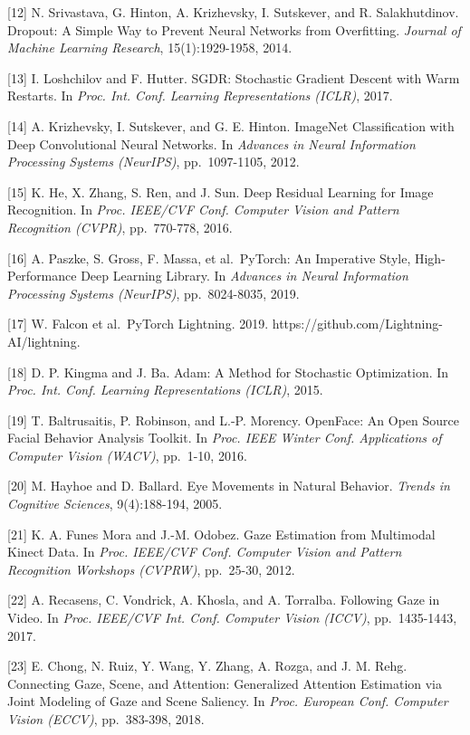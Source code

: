 \documentclass[
]{article}
\begin{document}
{[}12{]} N. Srivastava, G. Hinton, A. Krizhevsky, I. Sutskever, and R.
Salakhutdinov. Dropout: A Simple Way to Prevent Neural Networks from
Overfitting. \emph{Journal of Machine Learning Research},
15(1):1929-1958, 2014.

{[}13{]} I. Loshchilov and F. Hutter. SGDR: Stochastic Gradient Descent
with Warm Restarts. In \emph{Proc. Int. Conf. Learning Representations
(ICLR)}, 2017.

{[}14{]} A. Krizhevsky, I. Sutskever, and G. E. Hinton. ImageNet
Classification with Deep Convolutional Neural Networks. In
\emph{Advances in Neural Information Processing Systems (NeurIPS)},
pp.~1097-1105, 2012.

{[}15{]} K. He, X. Zhang, S. Ren, and J. Sun. Deep Residual Learning for
Image Recognition. In \emph{Proc. IEEE/CVF Conf. Computer Vision and
Pattern Recognition (CVPR)}, pp.~770-778, 2016.

{[}16{]} A. Paszke, S. Gross, F. Massa, et al.~PyTorch: An Imperative
Style, High-Performance Deep Learning Library. In \emph{Advances in
Neural Information Processing Systems (NeurIPS)}, pp.~8024-8035, 2019.

{[}17{]} W. Falcon et al.~PyTorch Lightning. 2019.
https://github.com/Lightning-AI/lightning.

{[}18{]} D. P. Kingma and J. Ba. Adam: A Method for Stochastic
Optimization. In \emph{Proc. Int. Conf. Learning Representations
(ICLR)}, 2015.

{[}19{]} T. Baltrusaitis, P. Robinson, and L.-P. Morency. OpenFace: An
Open Source Facial Behavior Analysis Toolkit. In \emph{Proc. IEEE Winter
Conf. Applications of Computer Vision (WACV)}, pp.~1-10, 2016.

{[}20{]} M. Hayhoe and D. Ballard. Eye Movements in Natural Behavior.
\emph{Trends in Cognitive Sciences}, 9(4):188-194, 2005.

{[}21{]} K. A. Funes Mora and J.-M. Odobez. Gaze Estimation from
Multimodal Kinect Data. In \emph{Proc. IEEE/CVF Conf. Computer Vision
and Pattern Recognition Workshops (CVPRW)}, pp.~25-30, 2012.

{[}22{]} A. Recasens, C. Vondrick, A. Khosla, and A. Torralba. Following
Gaze in Video. In \emph{Proc. IEEE/CVF Int. Conf. Computer Vision
(ICCV)}, pp.~1435-1443, 2017.

{[}23{]} E. Chong, N. Ruiz, Y. Wang, Y. Zhang, A. Rozga, and J. M. Rehg.
Connecting Gaze, Scene, and Attention: Generalized Attention Estimation
via Joint Modeling of Gaze and Scene Saliency. In \emph{Proc. European
Conf. Computer Vision (ECCV)}, pp.~383-398, 2018.
\end{document}
